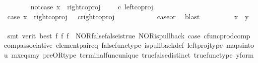 \begin{isabellebody}
\isanewline
\ \ \ \ \ \ \isamarkupfalse%
\ not{\isacharunderscore}{\kern0pt}case{}{\isacharcolon}{\kern0pt}\ {\isachardoublequoteopen}x\ {\isasymnoteq}\ right{\isacharunderscore}{\kern0pt}coproj\ {\isasymone}\ {\isacharparenleft}{\kern0pt}{\isasymone}\ {\isasymCoprod}\ {\isasymone}{\isacharparenright}{\kern0pt}\ {\isasymcirc}\isactrlsub c\ left{\isacharunderscore}{\kern0pt}coproj\ {\isasymone}\ {\isasymone}{\isachardoublequoteclose}\isanewline
\ \ \ \ \ \ \isamarkupfalse%
\ \isamarkupfalse%
\ case{}{\isacharcolon}{\kern0pt}\ {\isachardoublequoteopen}x\ {\isacharequal}{\kern0pt}\ right{\isacharunderscore}{\kern0pt}coproj\ {\isasymone}\ {\isacharparenleft}{\kern0pt}{\isasymone}{\isasymCoprod}{\isasymone}{\isacharparenright}{\kern0pt}\ {\isasymcirc}\isactrlsub c{\isacharparenleft}{\kern0pt}right{\isacharunderscore}{\kern0pt}coproj\ {\isasymone}\ {\isasymone}{\isacharparenright}{\kern0pt}{\isachardoublequoteclose}\isanewline
\ \ \ \ \ \ \ \ \isamarkupfalse%
\ case{}{\isacharunderscore}{\kern0pt}or{\isacharunderscore}{\kern0pt}{}\ \isamarkupfalse%
\ blast\isanewline
\ \ \ \ \ \ \isamarkupfalse%
\ \isamarkupfalse%
\ {\isachardoublequoteopen}x\ {\isacharequal}{\kern0pt}\ y{\isachardoublequoteclose}\isanewline
\ \ \ \ \ \ \ \ \isamarkupfalse%
\ {\isacharparenleft}{\kern0pt}smt\ {\isacharparenleft}{\kern0pt}verit{\isacharcomma}{\kern0pt}\ best{\isacharparenright}{\kern0pt}\ f{}\ f{}\ f{}\ \ NOR{\isacharunderscore}{\kern0pt}false{\isacharunderscore}{\kern0pt}false{\isacharunderscore}{\kern0pt}is{\isacharunderscore}{\kern0pt}true\ NOR{\isacharunderscore}{\kern0pt}is{\isacharunderscore}{\kern0pt}pullback\ case{}\ cfunc{\isacharunderscore}{\kern0pt}prod{\isacharunderscore}{\kern0pt}comp\ comp{\isacharunderscore}{\kern0pt}associative{}\ element{\isacharunderscore}{\kern0pt}pair{\isacharunderscore}{\kern0pt}eq\ false{\isacharunderscore}{\kern0pt}func{\isacharunderscore}{\kern0pt}type\ is{\isacharunderscore}{\kern0pt}pullback{\isacharunderscore}{\kern0pt}def\ left{\isacharunderscore}{\kern0pt}proj{\isacharunderscore}{\kern0pt}type\ maps{\isacharunderscore}{\kern0pt}into{\isacharunderscore}{\kern0pt}{}u{}\ mx{\isacharunderscore}{\kern0pt}eqs{\isacharunderscore}{\kern0pt}my\ pre{\isacharunderscore}{\kern0pt}OR{\isacharunderscore}{\kern0pt}type\ terminal{\isacharunderscore}{\kern0pt}func{\isacharunderscore}{\kern0pt}unique\ true{\isacharunderscore}{\kern0pt}false{\isacharunderscore}{\kern0pt}distinct\ true{\isacharunderscore}{\kern0pt}func{\isacharunderscore}{\kern0pt}type\ y{\isacharunderscore}{\kern0pt}form{\isacharparenright}{\kern0pt}\isanewline

\end{isabellebody}
